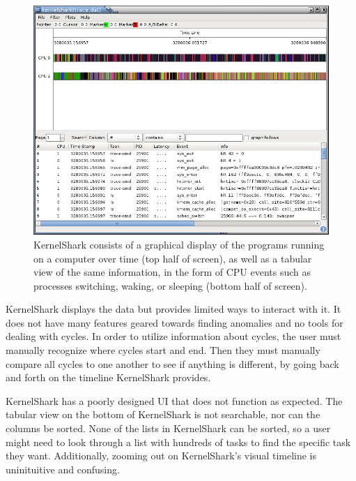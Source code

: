 \documentclass{hmcclinic}
\begin{document}
\begin{figure}[H]
  \centering
      \includegraphics[width=4.95in]{kshark-open.png}
  \caption{KernelShark consists of a graphical display of the programs running on a computer over time (top half of screen), as well as a tabular view of the same information, in the form of CPU events such as processes switching, waking, or sleeping (bottom half of screen).}
\end{figure}

KernelShark displays the data but provides limited ways to interact with it. It
does not have many features geared towards finding anomalies and no tools for
dealing with cycles.  In order to utilize information about cycles, the user
must manually recognize where cycles start and end. Then they must manually
compare all cycles to one another to see if anything is different, by going back
and forth on the timeline KernelShark provides.

KernelShark has a poorly designed UI that does not function as
expected. The tabular view on the bottom of KernelShark is not searchable, nor
can the columns be sorted. None of the lists in KernelShark can be sorted, so a user might need to look through a list
with hundreds of tasks to find the specific task they want. Additionally, zooming out on
KernelShark's visual timeline is uninituitive and confusing.

\end{document}
